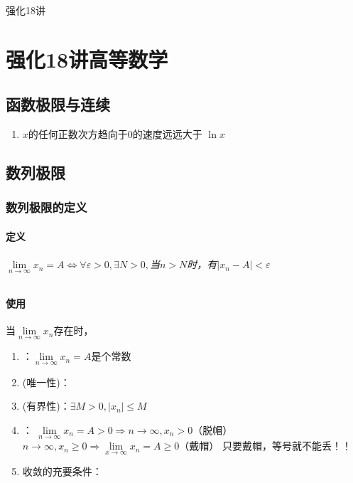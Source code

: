强化18讲

\part{强化18讲高等数学}

\chapter{函数极限与连续}

\begin{enumerate}
    \item $x$的任何正数次方趋向于0的速度远远大于 $\ln x$
\end{enumerate}

\chapter{数列极限}

\section{数列极限的定义}

\subsection{定义}

\paragraph{$\lim \limits_{n\to \infty}x_n=A \Leftrightarrow \forall \varepsilon >0,\exists N>0,$当$n>N$时，有$|x_n-A|<\varepsilon$}

\subsection{使用}

当$\lim \limits_{n\to \infty}x_n$存在时，

\begin{enumerate}
    \item {}：$\lim \limits_{n\to \infty}x_n=A$是个常数
    \item (唯一性)：
    \item (有界性)：$\exists M>0,|x_n|\le M$
    \item {}：\newline
        $\lim \limits_{n\to \infty}x_n=A>0\Rightarrow n\to \infty, x_n>0$（脱帽）\newline
        $n\to \infty,x_n\ge 0\Rightarrow \lim \limits_{x\to \infty}x_n=A\ge 0$（戴帽）\newline
        只要戴帽，等号就不能丢！！

    \item 收敛的充要条件：
\end{enumerate}